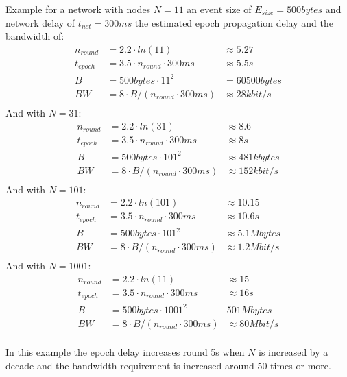 Example for a network with nodes $N=11$ an event size of $E_{size}=500bytes$ and network delay of $t_{net}=300ms$ the estimated epoch propagation delay
and the bandwidth of:
\begin{align*}
n_{round} &= 2.2 \cdot ln(11) &\approx  5.27\\
t_{epoch} &= 3.5 \cdot n_{round} \cdot 300ms & \approx 5.5s \\
B &= 500bytes \cdot 11^2 &= 60500bytes \\
BW &= 8 \cdot B / (n_{round}\cdot 300ms) &\approx 28kbit/s \\
\end{align*}
And with $N=31$:
\begin{align*}
n_{round} &= 2.2 \cdot ln(31) & \approx  8.6\\
t_{epoch} &= 3.5 \cdot n_{round} \cdot 300ms & \approx 8s \\
B &= 500bytes \cdot 101^2 & \approx 481kbytes \\
BW &= 8 \cdot B / (n_{round}\cdot 300ms) &\approx 152kbit/s \\
\end{align*}
And with $N=101$:
\begin{align*}
n_{round} &= 2.2 \cdot ln(101) & \approx  10.15\\
t_{epoch} &= 3.5 \cdot n_{round} \cdot 300ms & \approx 10.6s \\
B &= 500bytes \cdot 101^2 & \approx 5.1Mbytes \\
BW &= 8 \cdot B / (n_{round}\cdot 300ms) &\approx 1.2Mbit/s \\
\end{align*}
And with $N=1001$:
\begin{align*}
n_{round} &= 2.2 \cdot ln(11) & \approx  15\\
t_{epoch} &= 3.5 \cdot n_{round} \cdot 300ms & \approx 16s \\
B &= 500bytes \cdot 1001^2 & 501Mbytes \\
BW &= 8 \cdot B / (n_{round}\cdot 300ms) &\approx 80Mbit/s \\
\end{align*}

In this example the epoch delay increases round 5s when $N$ is increased by a decade and the bandwidth requirement is increased around 50 times or more.

